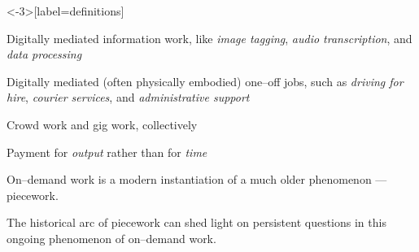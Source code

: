 \documentclass[presentation]{subfiles}
\begin{document}
\begin{frame}<-3>[label=definitions]{}
  \begin{description}
    \item<1-> [Crowd work] Digitally mediated \alert{information work}, like 
      \emph{image tagging}, \emph{audio transcription}, and \emph{data processing}\par
      \scriptsize{\textcite{crowdworkFuture}\par}\normalsize{}
    \item<2-> [Gig work] Digitally mediated (often \alert{physically embodied}) one--off jobs,
      such as
      \emph{driving for hire},
      \emph{courier services},
      and \emph{administrative support}\par
      \scriptsize{\textcite{friedman2014workers,Parigi:2016:GE:3026779.3013496}\par}\normalsize{}
    \item<3-> [On--demand work] Crowd work and gig work, collectively
  \end{description}
  \begin{description}
    \item<6-> [\textrm{Piecework}] \textrm{Payment for \emph{output} rather than for \emph{time}}
  \end{description}
\end{frame}


\begin{frame}[standout,label=takeaway]{}
  On--demand work is a modern instantiation of a much older phenomenon
  --- \alert{piecework}.

  {\normalsize The historical arc of piecework
  can shed light on persistent questions
  in this ongoing phenomenon of on--demand work.}
\end{frame}

\end{document}
